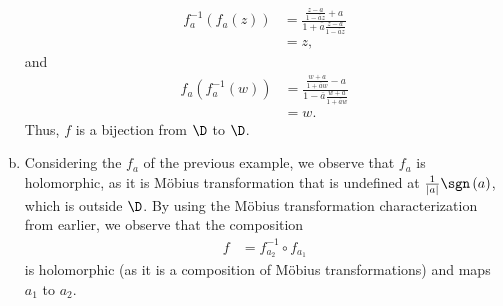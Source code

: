 \documentclass[10pt]{mypackage}
\begin{document}
\begin{solution}
\begin{enumerate}[(a)]
\begin{align*}
        f_a^{-1}\left( f_a(z) \right) &= \frac{\frac{z-a}{1- \overline{a}z} + a}{1 + \overline{a}\frac{z-a}{1- \overline{a}z}}\\
                                      &= z,
      \end{align*}
      and
      \begin{align*}
        f_a\left( f_a^{-1}\left( w \right) \right) &= \frac{\frac{w+a}{1 + \overline{a}w} - a}{1 - \overline{a}\frac{w+a}{1 + \overline{a}w}}\\
                                                   &= w.
      \end{align*}
      Thus, $f$ is a bijection from $\D$ to $\D$.
    \item Considering the $f_a$ of the previous example, we observe that $f_a$ is holomorphic, as it is Möbius transformation that is undefined at $ \frac{1}{\left\vert a \right\vert} \sgn\left( a \right) $, which is outside $\D$. By using the Möbius transformation characterization from earlier, we observe that the composition
      \begin{align*}
        f &= f_{a_2}^{-1}\circ f_{a_1}
      \end{align*}
      is holomorphic (as it is a composition of Möbius transformations) and maps $a_1$ to $a_2$.
  \end{enumerate}
\end{solution}
\end{document}
